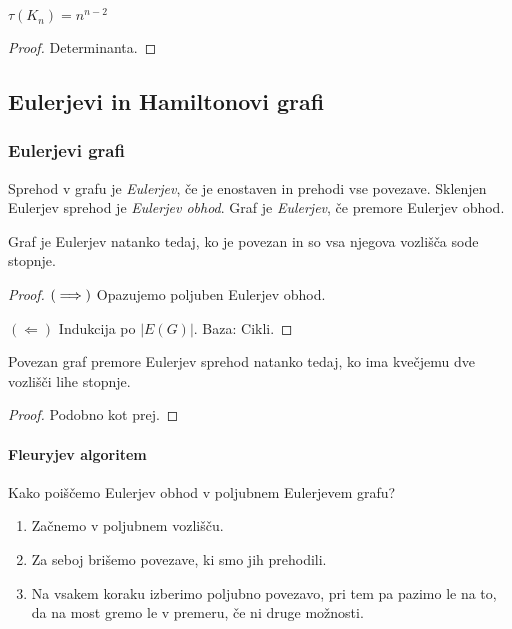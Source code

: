 \begin{izrek}[Cayley]
    $\tau(K_n) = n^{n-2}$
\end{izrek}

\begin{proof}
    Determinanta.
\end{proof}

\newpage
\subsection{Eulerjevi in Hamiltonovi grafi}
\subsubsection{Eulerjevi grafi}
\begin{definicija}
    Sprehod v grafu je \emph{Eulerjev}, če je enostaven in prehodi vse povezave. Sklenjen Eulerjev sprehod je \emph{Eulerjev obhod}. Graf je \emph{Eulerjev}, če premore Eulerjev obhod.
\end{definicija}

\begin{izrek}
    Graf je Eulerjev natanko tedaj, ko je povezan in so vsa njegova vozlišča sode stopnje.
\end{izrek}

\begin{proof}
    $(\implies)$ Opazujemo poljuben Eulerjev obhod.

    $(\Leftarrow)$ Indukcija po $|E(G)|$. Baza: Cikli.
\end{proof}

\begin{izrek}
    Povezan graf premore Eulerjev sprehod natanko tedaj, ko ima kvečjemu dve vozlišči lihe stopnje.
\end{izrek}

\begin{proof}
    Podobno kot prej.
\end{proof}

\paragraph{Fleuryjev algoritem} Kako poiščemo Eulerjev obhod v poljubnem Eulerjevem grafu?

\begin{enumerate}
    \item Začnemo v poljubnem vozlišču.
    \item Za seboj brišemo povezave, ki smo jih prehodili.
    \item Na vsakem koraku izberimo poljubno povezavo, pri tem pa pazimo le na to, da na most gremo le v premeru, če ni druge možnosti.
\end{enumerate}

